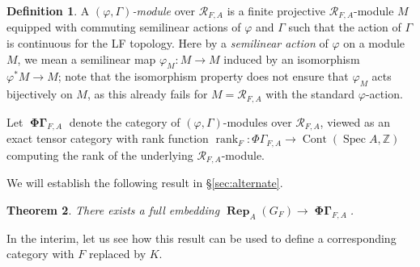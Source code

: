 \documentclass[12pt]{amsart}
\newtheorem{theorem}{Theorem}[section]
\theoremstyle{definition}
\newtheorem{defn}[theorem]{Definition}
\numberwithin{equation}{theorem}
\newcommand{\ZZ}{\mathbb{Z}}
\newcommand{\calR}{\mathcal{R}}
\DeclareMathOperator{\Cont}{Cont}
\DeclareMathOperator{\PhiGamma}{\mathbf{\Phi \Gamma}}
\DeclareMathOperator{\rank}{rank}
\DeclareMathOperator{\Rep}{\mathbf{Rep}}
\DeclareMathOperator{\Spec}{Spec}
\begin{document}
\begin{defn}
A \emph{$(\varphi, \Gamma)$-module} over $\calR_{F,A}$ is a finite projective $\calR_{F,A}$-module $M$ equipped with commuting semilinear actions of $\varphi$ and $\Gamma$ such that the action of $\Gamma$ is continuous for the LF topology. Here by a \emph{semilinear action} of $\varphi$ on a module $M$, we mean a semilinear map $\varphi_M: M \to M$ induced by an isomorphism $\varphi^* M \to M$; note that the isomorphism property does not ensure that $\varphi_M$ acts bijectively on $M$, as this already fails for $M = \calR_{F,A}$ with the standard $\varphi$-action.

Let $\PhiGamma_{F,A}$ denote the category of $(\varphi, \Gamma)$-modules over $\calR_{F,A}$, viewed as an exact tensor category with rank function $\rank_F: \Phi\Gamma_{F,A} \to \Cont(\Spec A,\ZZ)$ computing the rank of the underlying $\calR_{F,A}$-module.
\end{defn}

We will establish the following result in \S\ref{sec:alternate}.
\begin{theorem} \label{T:phi gamma embedding1}
There exists a full embedding $\Rep_A(G_F) \to \PhiGamma_{F,A}$.
\end{theorem}
In the interim, let us see how this result can be used to define a corresponding category with $F$ replaced by $K$.
\end{document}
